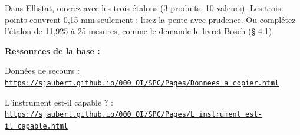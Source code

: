 \documentclass[10pt,a4paper]{article}
\begin{document}
\begin{tcolorbox}[plus]Dans Ellistat, ouvrez  avec les trois étalons (3 produits, 10 valeurs). Les trois points couvrent 0,15 mm seulement : lisez la pente avec prudence. Ou complétez l'étalon de 11,925 à 25 mesures, comme le demande le livret Bosch (§ 4.1).\end{tcolorbox}
\vfill{\footnotesize\color{uimm}\textbf{Ressources de la base :}\par Données de secours : \href{https://sjaubert.github.io/000_OI/SPC/Pages/Donnees_a_copier.html\#etalons}{\nolinkurl{https://sjaubert.github.io/000_OI/SPC/Pages/Donnees_a_copier.html}}\par L'instrument est-il capable ? : \href{https://sjaubert.github.io/000_OI/SPC/Pages/L_instrument_est-il_capable.html}{\nolinkurl{https://sjaubert.github.io/000_OI/SPC/Pages/L_instrument_est-il_capable.html}}}
\end{document}
